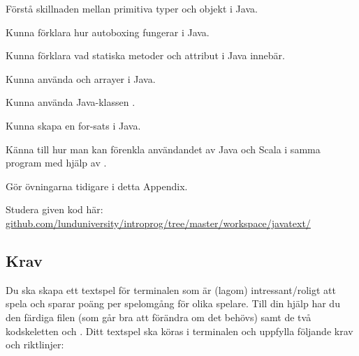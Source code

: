 

\begin{Goals}
\item Förstå skillnaden mellan primitiva typer och objekt i Java.
\item Kunna förklara hur autoboxing fungerar i Java.
\item Kunna förklara vad statiska metoder och attribut i Java innebär.
\item Kunna använda  och arrayer i Java.
\item Kunna använda Java-klassen .
\item Kunna skapa en for-sats i Java.
\item Känna till hur man kan förenkla användandet av Java och Scala i samma program med hjälp av .
\end{Goals}

\begin{Preparations}
\item Gör övningarna tidigare i detta Appendix.
\item Studera given kod här: \\ \href{https://github.com/lunduniversity/introprog/tree/master/workspace/javatext/}{github.com/lunduniversity/introprog/tree/master/workspace/javatext/}
\end{Preparations}

\subsection{Krav}

Du ska skapa ett textspel för terminalen som är (lagom) intressant/roligt att spela och sparar poäng per spelomgång för olika spelare. Till din hjälp har du den färdiga filen  (som går bra att förändra om det behövs) samt de två kodskeletten  och . Ditt textspel ska köras i terminalen och uppfylla följande krav och riktlinjer:

